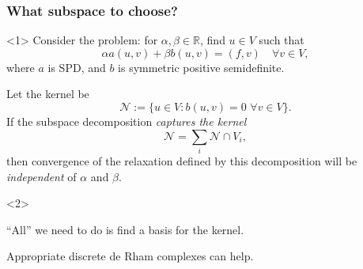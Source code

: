 \documentclass[presentation,aspectratio=43,10pt]{beamer}
\begin{document}
\begin{frame}
  \frametitle{What subspace to choose?}
  \begin{onlyenv}<1> Consider the problem: for
    $\alpha, \beta \in \mathbb{R}$, find $u \in V$ such that
    \begin{equation*}
      \alpha a(u, v) + \beta b(u, v) = (f, v) \quad \forall v \in V,
    \end{equation*}
    where $a$ is SPD, and $b$ is symmetric positive semidefinite.
  \end{onlyenv}
  \begin{theorem}
    Let the kernel be
    \begin{equation*}
      \mathcal{N} := \{ u \in V : b(u, v) = 0 \,\, \forall v \in V \}.
    \end{equation*}
    If the subspace decomposition \emph{captures the kernel}
    \begin{equation*}
      \mathcal{N} = \sum_i \mathcal{N} \cap V_i,
    \end{equation*}
    then convergence of the relaxation defined by this decomposition
    will be \emph{independent} of $\alpha$ and $\beta$.
    \nocite{Schoeberl:1999,Lee:2007}
  \end{theorem}
  \begin{onlyenv}<2>
    \begin{corollary}
      ``All'' we need to do is find a basis for the kernel.

      Appropriate discrete de Rham complexes can help.
    \end{corollary}
  \end{onlyenv}
\end{frame}
\end{document}
